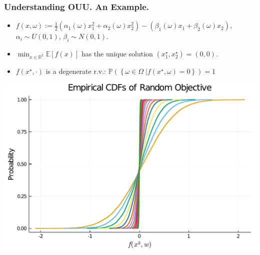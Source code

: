 \documentclass[aspectratio=169,xcolor=dvipsnames,10pt]{beamer}
\begin{document}
\begin{frame}\frametitle{Understanding OUU. An Example.}
\begin{exampleblock}{}
\begin{itemize}
\item $f(x,\omega) := \frac{1}{2}(\alpha_1(\omega) x_1^2 + \alpha_2(\omega) x_2^2) - (\beta_1(\omega) x_1 + \beta_2(\omega) x_2),$
$\alpha_i \sim U(0,1)$, $\beta_i \sim N(0,1)$. 
\item 
$
\min_{x \in \mathbb R^2 } \mathbb E[f(x)]
$
has the unique solution $(x^{\star}_1,x^{\star}_2) = (0,0)$. 
\item $f(x^{\star},\cdot)$ is a degenerate r.v.: $\mathbb P(\left\{\omega \in \Omega \; \left| f(x^{\star},\omega) = 0\right.\right\}) = 1$
\end{itemize}
\begin{center}
    \begin{minipage}{5cm}
        \includegraphics[width=\textwidth, keepaspectratio]{Part I/figures/empirical_cdfs_obj.pdf}
    \end{minipage}
\end{center}
\end{exampleblock}
\end{frame}
\end{document}
